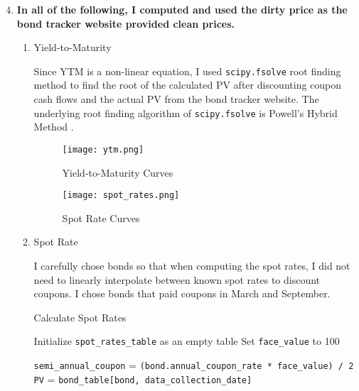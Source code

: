 \documentclass{article}
\begin{document}
\begin{enumerate}
    \setcounter{enumi}{3}
    \item \textbf{In all of the following, I computed and used the dirty price as the bond tracker website provided clean prices.} \hfill
          \begin{enumerate}
              \item Yield-to-Maturity

                    Since YTM is a non-linear equation, I used \texttt{scipy.fsolve} root finding method to find the root of the calculated PV after discounting coupon cash flows and the actual PV from the bond tracker website. The underlying root finding algorithm of \texttt{scipy.fsolve} is Powell's Hybrid Method \cite{wiki:Powell_dog_leg_method}.
                    \begin{figure}[H]
                        \centering
                        \begin{minipage}{0.45\textwidth}
                            \centering
                            \texttt{[image: ytm.png]}
                            \caption{Yield-to-Maturity Curves}
                        \end{minipage}
                        \begin{minipage}{0.45\textwidth}
                            \centering
                            \texttt{[image: spot\_rates.png]}
                            \caption{Spot Rate Curves}
                        \end{minipage}
                    \end{figure}

              \item Spot Rate

                    I carefully chose bonds so that when computing the spot rates, I did not need to linearly interpolate between known spot rates to discount coupons. I chose bonds that paid coupons in March and September.
                    \begin{algorithm}[H]
                        \caption{Calculate Spot Rates}
                        \begin{algorithmic}[1]
                            \State Initialize \texttt{spot\_rates\_table} as an empty table
                            \State Set \texttt{face\_value} to 100

                            \State \texttt{semi\_annual\_coupon} = \texttt{(bond.annual\_coupon\_rate * face\_value) / 2}
                            \State \texttt{PV} = \texttt{bond\_table[bond, data\_collection\_date]}


\end{algorithmic}
\end{algorithm}
\end{enumerate}
\end{enumerate}
\end{document}
